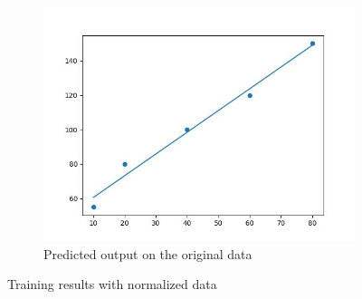 \documentclass{article}
\begin{document}
\begin{figure}[H]
    \begin{subfigure}{0.5\linewidth}
        \includegraphics[width=\linewidth]{output.jpg} 
        \caption{Predicted output on the original data}
    \end{subfigure}
    
    \caption{Training results with normalized data}
    \label{fig:enter-label}
\end{figure}
\end{document}
